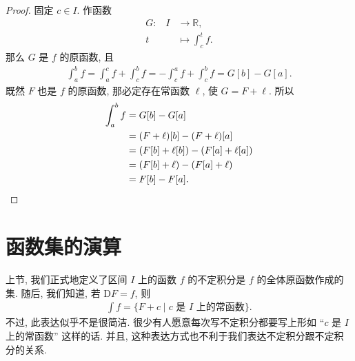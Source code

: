 \begin{proof}
    固定 $c \in I$. 作函数
    \begin{align*}
        \text{$G$:} \quad
        I & \to \mathbb{R},           \\
        t & \mapsto \int_{c}^{t} {f}.
    \end{align*}
    那么 $G$ 是 $f$ 的原函数, 且
    \begin{align*}
        \int_{a}^{b} {f}
        = \int_{a}^{c} {f} + \int_{c}^{b} {f}
        = -\int_{c}^{a} {f} + \int_{c}^{b} {f}
        = G[b] - G[a].
    \end{align*}
    既然 $F$ 也是 $f$ 的原函数, 那必定存在常函数 $\ell$, 使 $G = F + \ell$. 所以
    \begin{align*}
        \int_{a}^{b} {f}
        = {} & G[b] - G[a]                         \\
        = {} & (F + \ell)[b] - (F + \ell)[a]       \\
        = {} & (F[b] + \ell[b]) - (F[a] + \ell[a]) \\
        = {} & (F[b] + \ell) - (F[a] + \ell)       \\
        = {} & F[b] - F[a]. \qedhere
    \end{align*}
\end{proof}

\section{函数集的演算}

上节, 我们正式地定义了区间 $I$ 上的函数 $f$ 的不定积分是 $f$ 的全体原函数作成的集. 随后, 我们知道, 若 $\mathrm{D}F = f$, 则
\begin{align*}
    \int {f} = \{ F + c \mid \text{$c$ 是 $I$ 上的常函数} \}.
\end{align*}
不过, 此表达似乎不是很简洁. 很少有人愿意每次写不定积分都要写上形如 ``$c$ 是 $I$ 上的常函数'' 这样的话. 并且, 这种表达方式也不利于我们表达不定积分跟不定积分的关系.

